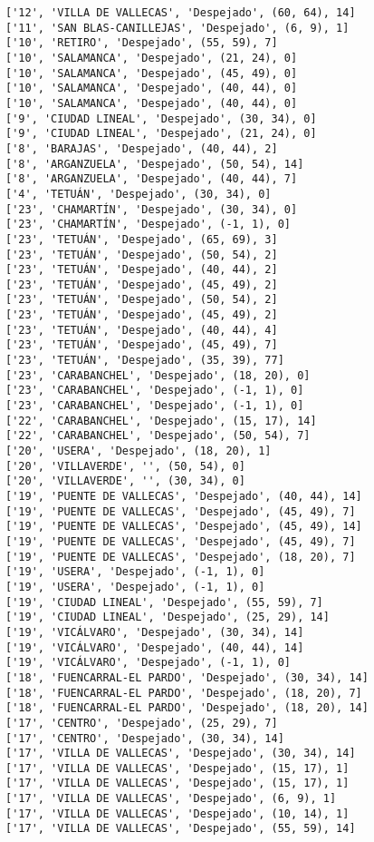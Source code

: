 \documentclass[11pt]{article}
\begin{document}
\begin{Verbatim}[commandchars=\\\{\}]
['12', 'VILLA DE VALLECAS', 'Despejado', (60, 64), 14]
['11', 'SAN BLAS-CANILLEJAS', 'Despejado', (6, 9), 1]
['10', 'RETIRO', 'Despejado', (55, 59), 7]
['10', 'SALAMANCA', 'Despejado', (21, 24), 0]
['10', 'SALAMANCA', 'Despejado', (45, 49), 0]
['10', 'SALAMANCA', 'Despejado', (40, 44), 0]
['10', 'SALAMANCA', 'Despejado', (40, 44), 0]
['9', 'CIUDAD LINEAL', 'Despejado', (30, 34), 0]
['9', 'CIUDAD LINEAL', 'Despejado', (21, 24), 0]
['8', 'BARAJAS', 'Despejado', (40, 44), 2]
['8', 'ARGANZUELA', 'Despejado', (50, 54), 14]
['8', 'ARGANZUELA', 'Despejado', (40, 44), 7]
['4', 'TETUÁN', 'Despejado', (30, 34), 0]
['23', 'CHAMARTÍN', 'Despejado', (30, 34), 0]
['23', 'CHAMARTÍN', 'Despejado', (-1, 1), 0]
['23', 'TETUÁN', 'Despejado', (65, 69), 3]
['23', 'TETUÁN', 'Despejado', (50, 54), 2]
['23', 'TETUÁN', 'Despejado', (40, 44), 2]
['23', 'TETUÁN', 'Despejado', (45, 49), 2]
['23', 'TETUÁN', 'Despejado', (50, 54), 2]
['23', 'TETUÁN', 'Despejado', (45, 49), 2]
['23', 'TETUÁN', 'Despejado', (40, 44), 4]
['23', 'TETUÁN', 'Despejado', (45, 49), 7]
['23', 'TETUÁN', 'Despejado', (35, 39), 77]
['23', 'CARABANCHEL', 'Despejado', (18, 20), 0]
['23', 'CARABANCHEL', 'Despejado', (-1, 1), 0]
['23', 'CARABANCHEL', 'Despejado', (-1, 1), 0]
['22', 'CARABANCHEL', 'Despejado', (15, 17), 14]
['22', 'CARABANCHEL', 'Despejado', (50, 54), 7]
['20', 'USERA', 'Despejado', (18, 20), 1]
['20', 'VILLAVERDE', '', (50, 54), 0]
['20', 'VILLAVERDE', '', (30, 34), 0]
['19', 'PUENTE DE VALLECAS', 'Despejado', (40, 44), 14]
['19', 'PUENTE DE VALLECAS', 'Despejado', (45, 49), 7]
['19', 'PUENTE DE VALLECAS', 'Despejado', (45, 49), 14]
['19', 'PUENTE DE VALLECAS', 'Despejado', (45, 49), 7]
['19', 'PUENTE DE VALLECAS', 'Despejado', (18, 20), 7]
['19', 'USERA', 'Despejado', (-1, 1), 0]
['19', 'USERA', 'Despejado', (-1, 1), 0]
['19', 'CIUDAD LINEAL', 'Despejado', (55, 59), 7]
['19', 'CIUDAD LINEAL', 'Despejado', (25, 29), 14]
['19', 'VICÁLVARO', 'Despejado', (30, 34), 14]
['19', 'VICÁLVARO', 'Despejado', (40, 44), 14]
['19', 'VICÁLVARO', 'Despejado', (-1, 1), 0]
['18', 'FUENCARRAL-EL PARDO', 'Despejado', (30, 34), 14]
['18', 'FUENCARRAL-EL PARDO', 'Despejado', (18, 20), 7]
['18', 'FUENCARRAL-EL PARDO', 'Despejado', (18, 20), 14]
['17', 'CENTRO', 'Despejado', (25, 29), 7]
['17', 'CENTRO', 'Despejado', (30, 34), 14]
['17', 'VILLA DE VALLECAS', 'Despejado', (30, 34), 14]
['17', 'VILLA DE VALLECAS', 'Despejado', (15, 17), 1]
['17', 'VILLA DE VALLECAS', 'Despejado', (15, 17), 1]
['17', 'VILLA DE VALLECAS', 'Despejado', (6, 9), 1]
['17', 'VILLA DE VALLECAS', 'Despejado', (10, 14), 1]
['17', 'VILLA DE VALLECAS', 'Despejado', (55, 59), 14]

\end{Verbatim}
\end{document}
